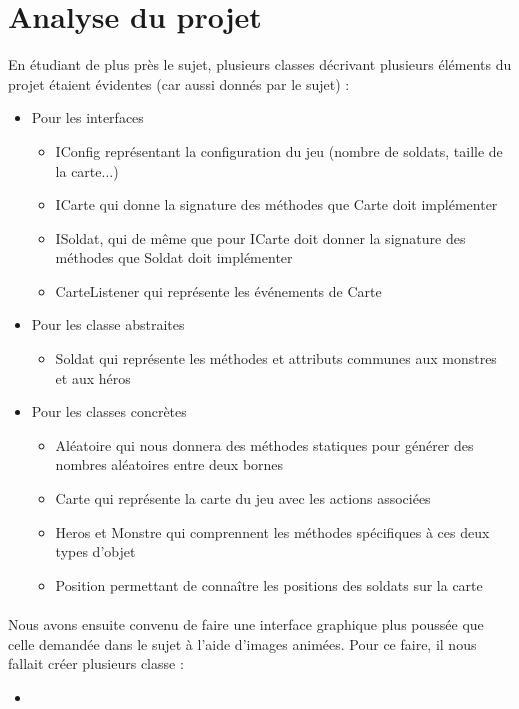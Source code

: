 \documentclass{article}
\begin{document}
\section{Analyse du projet}
En étudiant de plus près le sujet, plusieurs classes décrivant plusieurs éléments du projet étaient évidentes (car aussi donnés par le sujet) :
\begin{itemize}
  \item[\textbullet] \begin{bf}Pour les interfaces\end{bf}
        \begin{itemize}
         \item IConfig représentant la configuration du jeu (nombre de soldats, taille de la carte...)
         \item ICarte qui donne la signature des méthodes que Carte doit implémenter
         \item ISoldat, qui de même que pour ICarte doit donner la signature des méthodes que Soldat doit implémenter
         \item CarteListener qui représente les événements de Carte
        \end{itemize}
  \item[\textbullet] \begin{bf}Pour les classe abstraites\end{bf}
	\begin{itemize}
	 \item Soldat qui représente les méthodes et attributs communes aux monstres et aux héros
	\end{itemize}
  \item[\textbullet] \begin{bf}Pour les classes concrètes\end{bf}
	\begin{itemize}
	 \item Aléatoire qui nous donnera des méthodes statiques pour générer des nombres aléatoires entre deux bornes
	 \item Carte qui représente la carte du jeu avec les actions associées
	 \item Heros et Monstre qui comprennent les méthodes spécifiques à ces deux types d'objet
	 \item Position permettant de connaître les positions des soldats sur la carte
	\end{itemize}
\end{itemize}

\paragraph{}
Nous avons ensuite convenu de faire une interface graphique plus poussée que celle demandée dans le sujet à l'aide d'images animées.
Pour ce faire, il nous fallait créer plusieurs classe : 
\begin{itemize}
 \item %
\end{itemize}
\end{document}
